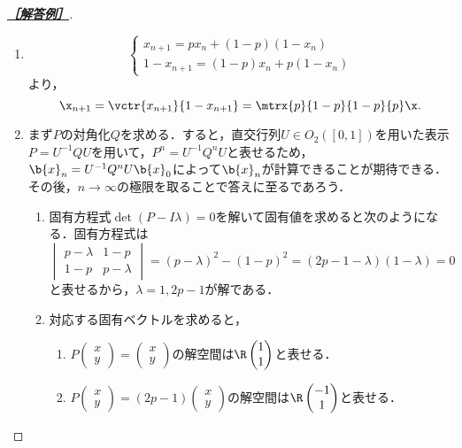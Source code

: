 \documentclass[uplatex,dvipdfmx]{jsarticle}
\begin{document}
\begin{proof}[\textbf{\underline{［解答例］}}]\mbox{}
    \begin{enumerate}
        \item \[\begin{cases}
            x_{n+1}=px_n+(1-p)(1-x_n)\\
            1-x_{n+1}=(1-p)x_{n}+p(1-x_n)
        \end{cases}\]
        より，
        \[\x_{n+1}=\vctr{x_{n+1}}{1-x_{n+1}}=\mtrx{p}{1-p}{1-p}{p}\x.\]
        \item まず$P$の対角化$Q$を求める．すると，直交行列$U\in O_2([0,1])$を用いた表示$P=U^{-1}QU$を用いて，$P^n=U^{-1}Q^nU$と表せるため，
        $\b{x}_n=U^{-1}Q^nU\b{x}_0$によって$\b{x}_n$が計算できることが期待できる．
        その後，$n\to\infty$の極限を取ることで答えに至るであろう．
        \begin{enumerate}
            \item 固有方程式$\det(P-I\lambda)=0$を解いて固有値を求めると次のようになる．固有方程式は
            \[\begin{vmatrix}p-\lambda&1-p\\1-p&p-\lambda\end{vmatrix}=(p-\lambda)^2-(1-p)^2=(2p-1-\lambda)(1-\lambda)=0\]
            と表せるから，$\lambda=1,2p-1$が解である．
            \item 対応する固有ベクトルを求めると，
            \begin{enumerate}
                \item $P\begin{pmatrix}x\\y\end{pmatrix}=\begin{pmatrix}x\\y\end{pmatrix}$の解空間は$\R \begin{pmatrix}1\\1\end{pmatrix}$と表せる．
                \item $P\begin{pmatrix}x\\y\end{pmatrix}=(2p-1)\begin{pmatrix}x\\y\end{pmatrix}$の解空間は$\R \begin{pmatrix}-1\\1\end{pmatrix}$と表せる．

\end{enumerate}
\end{enumerate}
\end{enumerate}
\end{proof}
\end{document}
